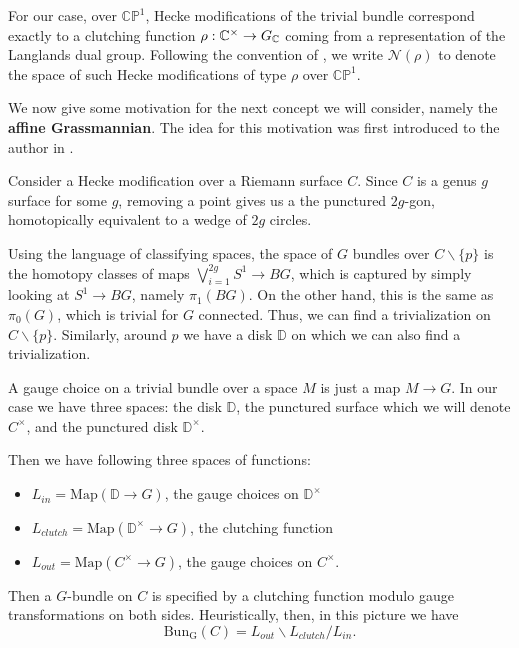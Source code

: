 	
	
	For our case, over $\mathbb{CP}^1$, Hecke modifications of the trivial bundle correspond exactly to a clutching function $\rho: \mathbb{C}^\times \to G_{\mathbb{C}}$ coming from a representation of the Langlands dual group. Following the convention of \cite{witten2010}, we write $\mathcal N(\rho)$ to denote the space of such Hecke modifications of type $\rho$ over $\mathbb{CP}^1$.
	
	We now give some motivation for the next concept we will consider, namely the \textbf{affine Grassmannian}. The idea for this motivation was first introduced to the author in \cite{Yoo17}.
	\begin{mot}
		Consider a Hecke modification over a Riemann surface $C$. Since $C$ is a genus $g$ surface for some $g$, removing a point gives us a the punctured $2g$-gon, homotopically equivalent to a wedge of $2g$ circles. 
	
		Using the language of classifying spaces, the space of $G$ bundles over $C \backslash \{p\}$ is the homotopy classes of maps $\bigvee_{i=1}^{2g} S^1 \to BG$, which is captured by simply looking at $S^1 \to BG$, namely $\pi_1(BG)$. On the other hand, this is the same as $\pi_0(G)$, which is trivial for $G$ connected. Thus, we can find a trivialization on $C \backslash \{ p \}$. Similarly, around $p$ we have a disk $\mathbb D$ on which we can also find a trivialization.
		
		A gauge choice on a trivial bundle over a space $M$ is just a map $M \to G$. In our case we have three spaces: the disk $\mathbb D$, the punctured surface which we will denote $C^\times$, and the punctured disk $\mathbb D^\times$. 
		
		Then we have following three spaces of functions:
		\begin{itemize}
			\item $L_{in} = \mathrm{Map}(\mathbb D \to G)$, the gauge choices on $\mathbb D^\times$
			\item $L_{clutch} = \mathrm{Map}(\mathbb D^\times \to G)$, the clutching function
			\item $L_{out} = \mathrm{Map}(C^\times \to G)$, the gauge choices on $C^\times$.
		\end{itemize}
		
		Then a $G$-bundle on $C$ is specified by a clutching function modulo gauge transformations on both sides.
		Heuristically, then, in this picture we have
		\[
			\mathrm{Bun_G}(C) = L_{out} \backslash L_{clutch} / L_{in}.
		\]
	\end{mot}
